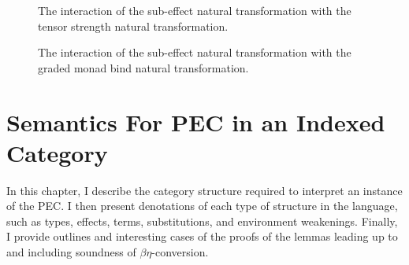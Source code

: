 \documentclass{Report}
\begin{document}
\begin{figure}
\centering
\begin{minipage}{0.45\textwidth}\label{SubeffectTensorStrength}
    \qquad
    \caption{The interaction of the sub-effect natural transformation with the tensor strength natural transformation.}
\end{minipage}  
\quad
\begin{minipage}{0.45\textwidth}\label{SubeffectBind}
\caption{The interaction of the sub-effect natural transformation with the graded monad  bind natural transformation.}
\end{minipage}  
\end{figure}






\chapter{Semantics For PEC in an Indexed Category}


In this chapter, I  describe the category structure required to interpret an instance of the PEC. I then present denotations of each type of structure in the language, such as types, effects, terms, substitutions, and environment weakenings. Finally, I provide outlines and interesting cases of the proofs of the lemmas leading up to and including soundness of $\beta\eta$-conversion. 
\end{document}
